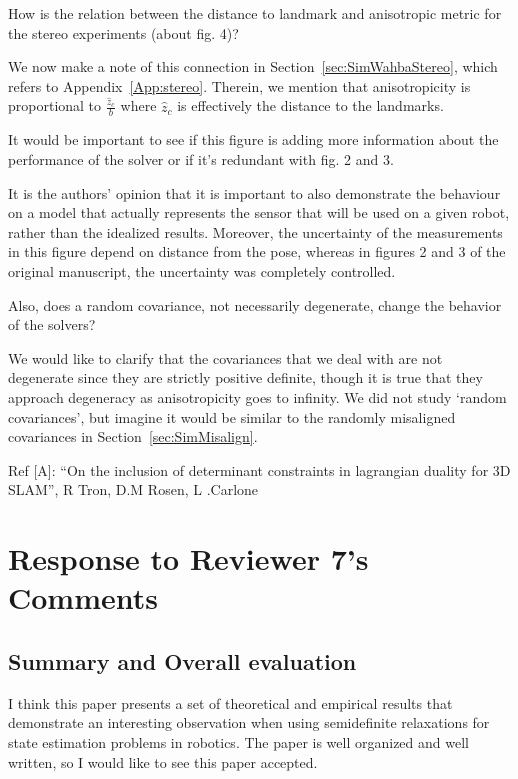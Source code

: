 How is the relation between the distance to landmark and anisotropic metric for the stereo experiments (about fig. 4)? 
\begin{response}
    We now make a note of this connection in Section~\ref{sec:SimWahbaStereo}, which refers to Appendix~\ref{App:stereo}. Therein, we mention that anisotropicity is proportional to $\frac{\hat{z}_c}{b}$ where $\hat{z}_c$ is effectively the distance to the landmarks.
\end{response}

It would be important to see if this figure is adding more information about the performance of the solver or if it's redundant with fig. 2 and 3.
\begin{response}
    It is the authors' opinion that it is important to also demonstrate the behaviour on a model that actually represents the sensor that will be used on a given robot, rather than the idealized results. Moreover, the uncertainty of the measurements in this figure depend on distance from the pose, whereas in figures 2 and 3 of the original manuscript, the uncertainty was completely controlled.
\end{response}

 Also, does a random covariance, not necessarily degenerate, change the behavior of the solvers? 
\begin{response}
    We would like to clarify that the covariances that we deal with are not degenerate since they are strictly positive definite, though it is true that they approach degeneracy as anisotropicity goes to infinity. We did not study `random covariances', but imagine it would be similar to the randomly misaligned covariances in Section~\ref{sec:SimMisalign}. 
\end{response}
Ref [A]: “On the inclusion of determinant constraints in lagrangian duality for 3D SLAM”, R Tron, D.M Rosen, L .Carlone

\section*{Response to Reviewer 7's Comments}

\subsection*{Summary and Overall evaluation}

I think this paper presents a set of theoretical and empirical results that demonstrate an interesting observation when using  semidefinite relaxations for state estimation problems in robotics. The paper is well organized and well written, so I would like to see this paper accepted.

